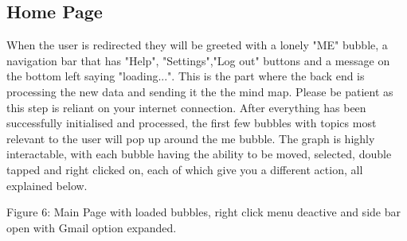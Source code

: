 \documentclass[hidelinks,english]{article}
\begin{document}
    \subsection{Home Page}
    When the user is redirected they will be greeted with a lonely "ME" bubble, a navigation bar that has "Help", "Settings","Log out" buttons and a message on the bottom left saying "loading...". This is the part where the back end is processing the new data and sending it the the mind map. Please be patient as this step is reliant on your internet connection. After everything has been successfully initialised and processed, the first few bubbles with topics most relevant to the user will pop up around the me bubble. The graph is highly interactable, with each bubble having the ability to be moved, selected, double tapped and right clicked on, each of which give you a different action, all explained below. 
    \begin{center}
      Figure 6: Main Page with loaded bubbles, right click menu deactive and side bar open with Gmail option expanded.
      \label{Main page}
    \end{center}
\end{document}

